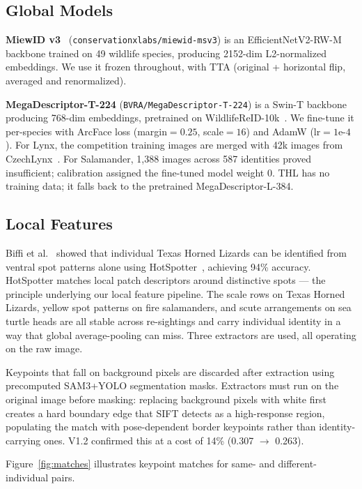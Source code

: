 \documentclass[]{ceurart}
\begin{document}
\subsection{Global Models}

\textbf{MiewID v3}~\cite{kholiavchenko2024miewid} (\texttt{conservationxlabs/miewid-msv3})
is an EfficientNetV2-RW-M backbone trained on 49 wildlife species, producing 2152-dim
L2-normalized embeddings. We use it frozen throughout, with TTA (original + horizontal
flip, averaged and renormalized).

\textbf{MegaDescriptor-T-224} (\texttt{BVRA/MegaDescriptor-T-224}) is a Swin-T
backbone producing 768-dim embeddings, pretrained on
WildlifeReID-10k~\cite{pecot2024wildlifereid}. We fine-tune it per-species with
ArcFace loss (margin$=0.25$, scale$=16$) and AdamW (lr$=1\text{e-}4$). For Lynx,
the competition training images are merged with 42k images from
CzechLynx~\cite{picek2025czechlynx}. For Salamander, 1,388 images across 587
identities proved insufficient; calibration assigned the fine-tuned model
weight 0. THL has no training data; it falls back to the
pretrained MegaDescriptor-L-384.

\subsection{Local Features}

Biffi et al.~\cite{biffi2025thl} showed that individual Texas Horned Lizards can
be identified from ventral spot patterns alone using HotSpotter~\cite{crall2013hotspotter},
achieving 94\% accuracy. HotSpotter matches local patch descriptors around
distinctive spots --- the principle underlying our local feature pipeline. The scale
rows on Texas Horned Lizards, yellow spot patterns on fire salamanders, and scute
arrangements on sea turtle heads are all stable across re-sightings and carry
individual identity in a way that global average-pooling can miss. Three
extractors are used, all operating on the raw image.

Keypoints that fall on background pixels are discarded after extraction using
precomputed SAM3+YOLO segmentation masks. Extractors must run on the original
image before masking: replacing background pixels with white first creates a
hard boundary edge that SIFT detects as a high-response region, populating
the match with pose-dependent border keypoints rather than identity-carrying
ones. V1.2 confirmed this at a cost of 14\% (0.307 $\to$ 0.263).

Figure~\ref{fig:matches} illustrates keypoint matches for same- and
different-individual pairs.
\end{document}
